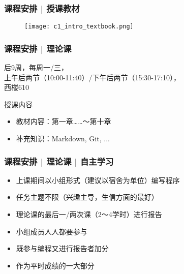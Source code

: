 \begin{frame}
  \frametitle{课程安排 | 授课教材}
  \begin{figure}
    \centering
    \texttt{[image: c1\_intro\_textbook.png]}
  \end{figure}
\end{frame}

\begin{frame}
  \frametitle{课程安排 | 理论课}
  \begin{center}
  \alert{后9周，每周一/三，\\ 上午后两节（10:00-11:40）/下午后两节（15:30-17:10），\\ 西楼610}\\
  \vspace{0.2cm}
  \end{center}
  \begin{block}{授课内容}
    \begin{itemize}
      \item 教材内容：第一章……～第十章
      \item 补充知识：Markdown, Git, ...
    \end{itemize}
  \end{block}
\end{frame}

\begin{frame}
  \frametitle{课程安排 | 理论课 | 自主学习}
  \begin{itemize}
    \item 上课期间以小组形式（建议以宿舍为单位）编写程序
    \item 任务主题不限（兴趣主导，生信方面的最好）
    \item 理论课的最后一/两次课（2～4学时）进行报告
    \item 小组成员人人都要参与
    \item 既参与编程又进行报告者加分
    \item 作为平时成绩的一大部分
  \end{itemize}
\end{frame}

